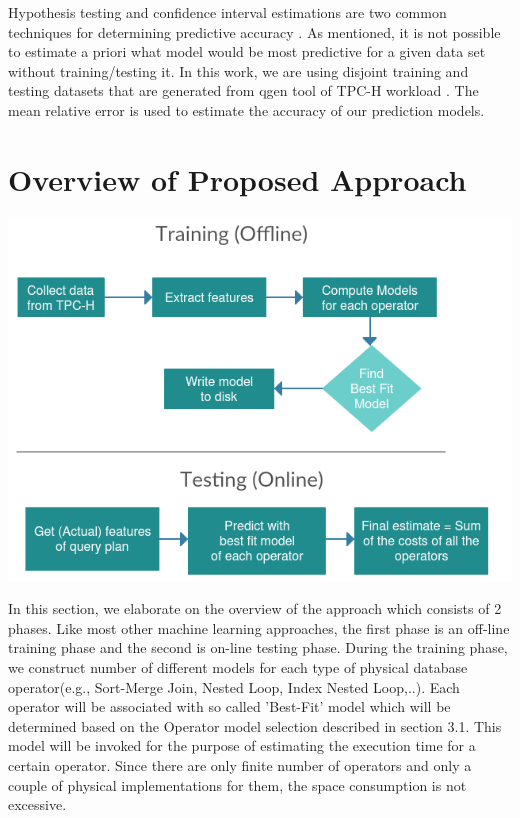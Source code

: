 \documentclass{article}
\begin{document}
\begin{multicols}{2}
	Hypothesis testing and confidence interval estimations are two common
techniques for determining predictive accuracy \cite{forecasting}. As mentioned, 
it is not possible to estimate a priori what model would be
most predictive for a given data set without training/testing it. In this work, we are using
disjoint training and testing datasets that are generated from qgen tool of TPC-H workload 		\cite{TPCH}. The mean relative error is used to estimate the accuracy of our prediction models.

	\section{Overview of Proposed Approach}
	
	\includegraphics[scale=0.4]{training.png}
	

	In this section, we elaborate on the overview of the approach which consists of 2 phases. Like 
	most other machine learning approaches, the first phase is an off-line training phase and the 
	second is on-line testing phase.
	During the training phase, we construct number of different 
	models for each type of physical database operator(e.g.,  Sort-Merge Join, Nested Loop, Index Nested 		Loop,..). Each operator will be associated with so called 'Best-Fit' model which will be determined 
	based on the Operator model selection described in section 3.1. This model will be invoked for the
	purpose of estimating the execution time for a certain operator. Since there are only finite number of 	operators and only a couple of physical implementations for them, the space consumption is not 				excessive. 


\end{multicols}
\end{document}

